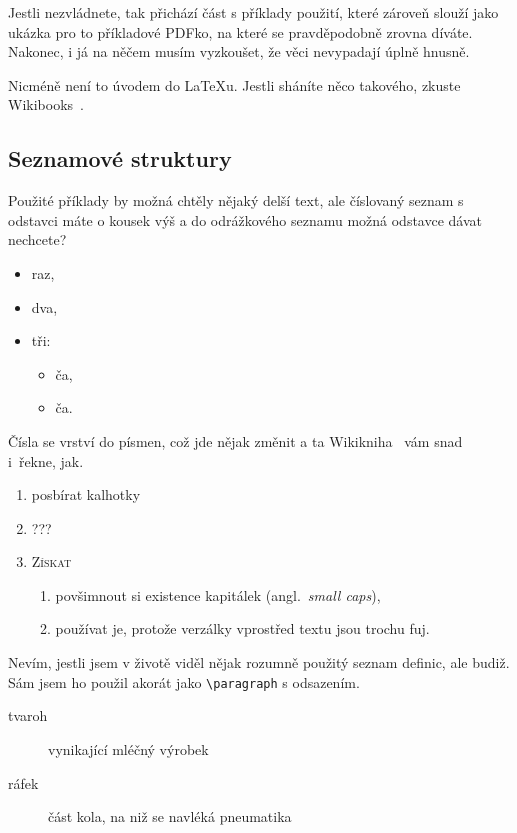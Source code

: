 Jestli nezvládnete, tak přichází část s příklady použití, které zároveň slouží
jako ukázka pro to příkladové PDFko, na které se pravděpodobně zrovna díváte.
Nakonec, i já na něčem musím vyzkoušet, že věci nevypadají úplně hnusně.

Nicméně není to úvodem do \LaTeX u. Jestli sháníte něco takového, zkuste
Wikibooks~\cite{wb}.

\subsection{Seznamové struktury}

Použité příklady by možná chtěly nějaký delší text, ale číslovaný seznam
s odstavci máte o kousek výš a do odrážkového seznamu možná odstavce dávat
nechcete?

\begin{itemize}
    \item raz,
    \item dva,
    \item tři:
    \begin{itemize}
        \item ča,
        \item ča.
    \end{itemize}
\end{itemize}

Čísla se vrství do písmen, což jde nějak změnit a ta Wikikniha~\cite{wb} vám
snad i~řekne, jak.

\begin{enumerate}
    \item posbírat kalhotky
    \item ???
    \item \textsc{Získat}
    \begin{enumerate}
        \item povšimnout si existence kapitálek (angl.~\emph{small caps}),
        \item používat je, protože verzálky vprostřed textu jsou trochu fuj.
    \end{enumerate}
\end{enumerate}

Nevím, jestli jsem v životě viděl nějak rozumně použitý seznam definic, ale
budiž. Sám jsem ho použil akorát jako \texttt{\textbackslash paragraph}
s odsazením.

\begin{description}
    \item[tvaroh] vynikající mléčný výrobek
    \item[ráfek] část kola, na niž se navléká pneumatika
\end{description}

